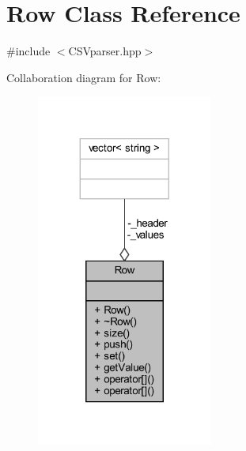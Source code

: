 \hypertarget{class_row}{}\section{Row Class Reference}
\label{class_row}


{\ttfamily \#include $<$C\+S\+Vparser.\+hpp$>$}



Collaboration diagram for Row\+:\nopagebreak
\begin{figure}[H]
\begin{center}
\leavevmode
\includegraphics[width=164pt]{class_row__coll__graph}
\end{center}
\end{figure}
